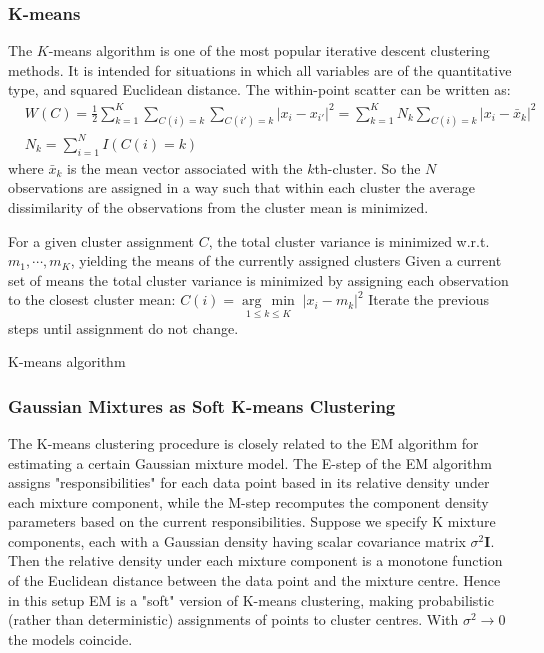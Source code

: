 \documentclass[12pt, letterpaper]{article}
\theoremstyle{definition}
\newcommand{\I}{\mathrm{\mathbf{I}}}
\newcommand{\argmin}[1]{\underset{#1}{\operatorname{arg}\,\operatorname{min}}\;}
\begin{document}
\subsubsection{K-means}
The $K$-means algorithm is one of the most popular iterative descent clustering methods. It is intended for situations in which all variables are of the quantitative type, and squared Euclidean distance.
The within-point scatter can be written as:
\begin{equation}
\begin{aligned}
&W(C) = \frac{1}{2}\sum_{k=1}^K \sum_{C(i) = k} \sum_{C(i') = k} |x_i - x_{i'}|^2= \sum_{k=1}^K N_k \sum_{C(i) = k}  |x_i - \bar{x}_{k}|^2\\
& N_k = \sum_{i=1}^N I(C(i) = k)
\end{aligned}
\end{equation}
where $\bar{x}_k$ is the mean vector associated with the $k$th-cluster. So the $N$ observations are assigned in a way such that within each cluster the average dissimilarity of the observations from the cluster mean is minimized.
\begin{algorithm}
For a given cluster assignment $C$, the total cluster variance is minimized w.r.t. $m_1, \cdots, m_K$, yielding the means of the currently assigned clusters\;
Given a current set of means the total cluster variance is minimized by assigning each observation to the closest cluster mean: $C(i) = \argmin{1\le k\le K}{|x_i-m_k|^2}$\;
Iterate the previous steps until assignment do not change.
\caption{K-means algorithm}
\end{algorithm}

\subsubsection{Gaussian Mixtures as Soft K-means Clustering}
The K-means clustering procedure is closely related to the EM algorithm for estimating a certain Gaussian mixture model. The E-step of the EM algorithm assigns "responsibilities" for each data point based in its relative density under each mixture component, while the M-step recomputes the component density parameters based on the current responsibilities. Suppose we specify K mixture components, each with a Gaussian density having scalar covariance matrix $\sigma^2\I$. Then the relative density under each mixture component is a monotone function of the Euclidean distance between the data point and the mixture centre. Hence in this setup EM is a "soft" version of K-means clustering, making probabilistic (rather than deterministic) assignments of points to cluster centres. With $\sigma^2 \rightarrow 0$  the models coincide.
\end{document}
